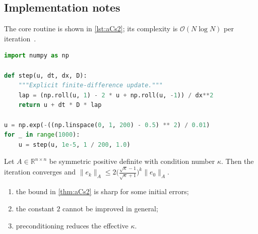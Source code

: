 \subsection{Implementation notes}\label{sec:aCs2-i}
The core routine is shown in \cref{lst:aCs2}; its complexity is $\mathcal{O}(N\log N)$ per iteration~\cite{appx-4}.

\begin{lstlisting}[language=python,caption={Reference implementation for aCs2.},label={lst:aCs2}]
import numpy as np

def step(u, dt, dx, D):
    """Explicit finite-difference update."""
    lap = (np.roll(u, 1) - 2 * u + np.roll(u, -1)) / dx**2
    return u + dt * D * lap

u = np.exp(-((np.linspace(0, 1, 200) - 0.5) ** 2) / 0.01)
for _ in range(1000):
    u = step(u, 1e-5, 1 / 200, 1.0)
\end{lstlisting}

\kant[9-12]
\begin{theorem}\label{thm:aCs2}
Let $A\in\mathbb{R}^{n\times n}$ be symmetric positive definite with condition number $\kappa$. Then the iteration converges and
$\lVert e_k\rVert_A \le 2\bigl(\tfrac{\sqrt\kappa-1}{\sqrt\kappa+1}\bigr)^k\lVert e_0\rVert_A$.
\end{theorem}
\begin{enumerate}[label=(\roman*)]
\item the bound in \cref{thm:aCs2} is sharp for some initial errors;
\item the constant $2$ cannot be improved in general;
\item preconditioning reduces the effective $\kappa$.
\end{enumerate}

\lipsum[93-93]
